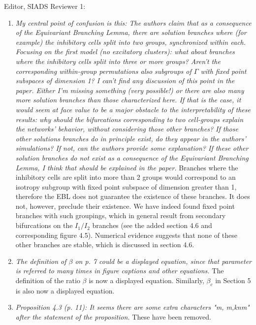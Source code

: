 \documentclass[11pt]{letter}
\begin{document}
\begin{letter}{Editor, SIADS}
Reviewer 1: 
\begin{enumerate}
\item \emph{My central point of confusion is this: The authors claim that as a consequence of the Equivariant Branching Lemma, there are solution branches where (for example) the inhibitory cells split into two groups, synchronized within each. Focusing on the first model (no excitatory clusters): what about branches where the inhibitory cells split into three or more groups? Aren't the corresponding within-group permutations also subgroups of $\Gamma$ with fixed point subspaces of dimension 1? I can't find any discussion of this point in the paper. Either I'm missing something (very possible!) or there are also many more solution branches than those characterized here. If that is the case, it would seem at face value to be a major obstacle to the interpretability of these results: why should the bifurcations corresponding to two cell-groups explain the networks' behavior, without considering those other branches? If those other solutions branches do in principle exist, do they appear in the authors' simulations? If not, can the authors provide some explanation? If these other solution branches do not exist as a consequence of the Equivariant Branching Lemma, I think that should be explained in the paper.}
Branches where the inhibitory cells are split into more than 2 groups would correspond to an isotropy subgroup with fixed point subspace of dimension greater than 1, therefore the EBL does not guarantee the existence of these branches. It does not, however, preclude their existence. We have indeed found fixed point branches with such groupings, which in general result from secondary bifurcations on the $I_1/I_2$ branches (see the added section 4.6 and corresponding figure 4.5). Numerical evidence suggests that none of these other branches are stable, which is discussed in section 4.6.

\vspace{4mm}

\item \emph{The definition of $\beta$ on p. 7 could be a displayed equation, since that parameter is referred to many times in figure captions and other equations. }
The definition of the ratio $\beta$ is now a displayed equation. Similarly, $\beta_c$ in Section 5 is also now a displayed equation.
\vspace{4mm} 

\item \emph{Proposition 4.3 (p. 11): It seems there are some extra characters "m, m,knm" after the statement of the proposition. }
These have been removed.
\vspace{4mm} 


\end{enumerate}
\end{letter}
\end{document}
